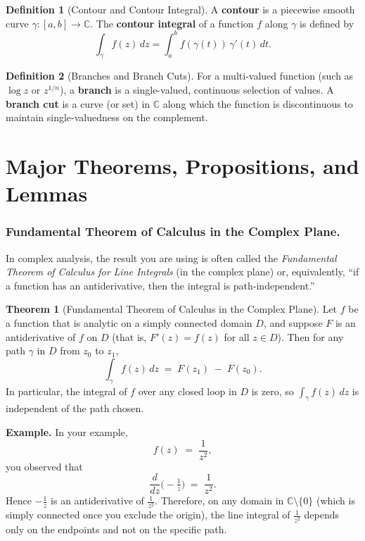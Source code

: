 \documentclass[12pt]{article}
\theoremstyle{definition} %
\newtheorem{theorem}{Theorem}
\newtheorem{definition}{Definition}
\theoremstyle{plain} %
\begin{document}
\begin{definition}[Contour and Contour Integral]
A \textbf{contour} is a piecewise smooth curve \(\gamma: [a,b] \to \mathbb{C}\). The \textbf{contour integral} of a function \(f\) along \(\gamma\) is defined by
\[
\int_\gamma f(z) \,dz = \int_a^b f(\gamma(t)) \, \gamma'(t) \, dt.
\]
\end{definition}

\begin{definition}[Branches and Branch Cuts]
For a multi-valued function (such as \(\log z\) or \(z^{1/n}\)), a \textbf{branch} is a single-valued, continuous selection of values. A \textbf{branch cut} is a curve (or set) in \(\mathbb{C}\) along which the function is discontinuous to maintain single-valuedness on the complement.
\end{definition}

\section{Major Theorems, Propositions, and Lemmas}
\subsubsection*{Fundamental Theorem of Calculus in the Complex Plane.}  
In complex analysis, the result you are using is often called the \emph{Fundamental Theorem of Calculus for Line Integrals} (in the complex plane) or, equivalently, “if a function has an antiderivative, then the integral is path‐independent.”

\begin{theorem}[Fundamental Theorem of Calculus in the Complex Plane]
Let $f$ be a function that is analytic on a simply connected domain $D$, and suppose $F$ is an antiderivative of $f$ on $D$ (that is, $F'(z) = f(z)$ for all $z \in D$). Then for any path $\gamma$ in $D$ from $z_0$ to $z_1$,
\[
\int_\gamma f(z)\,dz \;=\; F(z_1) \;-\; F(z_0).
\]
In particular, the integral of $f$ over any closed loop in $D$ is zero, so $\int_\gamma f(z)\,dz$ is independent of the path chosen.
\end{theorem}

\textbf{Example.}  
In your example,
\[
f(z) \;=\;\frac{1}{z^2},
\]
you observed that
\[
\frac{d}{dz}\bigl(-\tfrac{1}{z}\bigr) \;=\;\frac{1}{z^2}.
\]
Hence $-\tfrac{1}{z}$ is an antiderivative of $\tfrac{1}{z^2}$. Therefore, on any domain in $\mathbb{C}\setminus\{0\}$ (which is simply connected once you exclude the origin), the line integral of $\tfrac{1}{z^2}$ depends only on the endpoints and not on the specific path.
\end{document}
